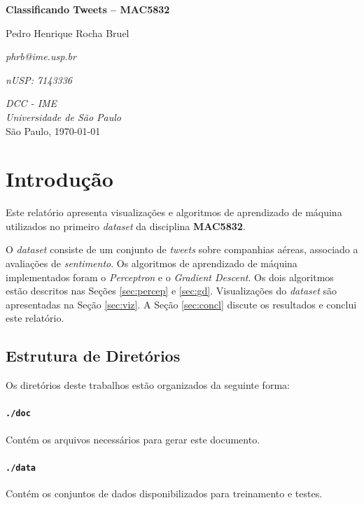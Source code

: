 \documentclass[a4paper, 12pt]{article}
\begin{document}
\begin{titlepage}
    \centering
    \vspace*{4cm}
    \textbf{\huge{Classificando Tweets -- MAC5832}}\\

    \vskip 1cm

    Pedro Henrique Rocha Bruel

    \emph{phrb@ime.usp.br}

    \emph{nUSP: 7143336}

    \vfill
    \normalsize{\emph{DCC - IME\\
    Universidade de São Paulo}\\}
    \normalsize{São Paulo, \today}
\end{titlepage}

\section{Introdução} \label{sec:intro}

Este relatório apresenta visualizações e algoritmos de aprendizado de máquina
utilizados no primeiro \textit{dataset} da disciplina \textbf{MAC5832}.

O \textit{dataset} consiste de um conjunto de \textit{tweets} sobre companhias
aéreas, associado a avaliações de \textit{sentimento}.  Os algoritmos de
aprendizado de máquina implementados foram o \textit{Perceptron} e o
\textit{Gradient Descent}. Os dois algoritmos estão descritos nas Seções
\ref{sec:percep} e \ref{sec:gd}.  Visualizações do \textit{dataset} são
apresentadas na Seção \ref{sec:viz}. A Seção \ref{sec:concl} discute os
resultados e conclui este relatório.

\subsection{Estrutura de Diretórios}

Os diretórios deste trabalhos estão organizados da
seguinte forma:

\paragraph{\texttt{./doc}} Contém os arquivos necessários
para gerar este documento.

\paragraph{\texttt{./data}} Contém os conjuntos de dados
disponibilizados para treinamento e testes.
\end{document}
